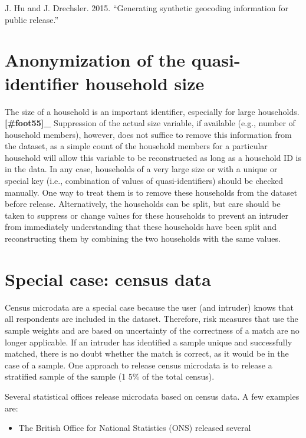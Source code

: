 \documentclass[letterpaper,10pt,english]{sphinxmanual}
\begin{document}
J. Hu and J. Drechsler. 2015. “Generating synthetic geocoding
information for public release.”


\section{Anonymization of the quasi-identifier household size}
\label{\detokenize{anon_methods:anonymization-of-the-quasi-identifier-household-size}}
The size of a household is an important identifier, especially for large
households. {\color{red}\bfseries{}{[}\#foot55{]}\_}  Suppression of the actual size
variable, if available (e.g., number of household members), however,
does not suffice to remove this information from the dataset, as a
simple count of the household members for a particular household will
allow this variable to be reconstructed as long as a household ID is in
the data. In any case, households of a very large size or with a unique
or special key (i.e., combination of values of quasi-identifiers) should
be checked manually. One way to treat them is to remove these households
from the dataset before release. Alternatively, the households can be
split, but care should be taken to suppress or change values for these
households to prevent an intruder from immediately understanding that
these households have been split and reconstructing them by combining
the two households with the same values.


\section{Special case: census data}
\label{\detokenize{anon_methods:special-case-census-data}}
Census microdata are a special case because the user (and intruder)
knows that all respondents are included in the dataset. Therefore, risk
measures that use the sample weights and are based on uncertainty of the
correctness of a match are no longer applicable. If an intruder has
identified a sample unique and successfully matched, there is no doubt
whether the match is correct, as it would be in the case of a sample.
One approach to release census microdata is to release a stratified
sample of the sample (1 \textendash{} 5\% of the total census). 

Several statistical offices release microdata based on census data. A
few examples are:
\begin{itemize}
\item {} 
The British Office for National Statistics (ONS) released several

\end{itemize}
\end{document}
